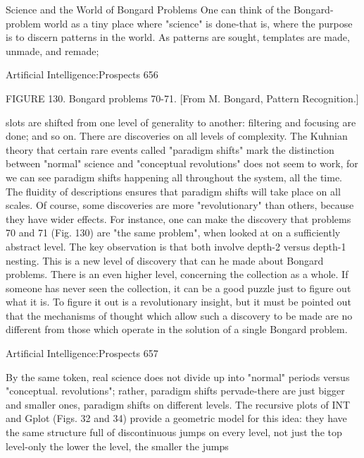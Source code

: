                  Science and the World of Bongard Problems
   One can think of the Bongard-problem world as a tiny place where "science" is
   done-that is, where the purpose is to discern patterns in the world. As patterns are
   sought, templates are made, unmade, and remade;




Artificial Intelligence:Prospects                                                      656

   FIGURE 130. Bongard problems 70-71. [From M. Bongard, Pattern
   Recognition.]

   slots are shifted from one level of generality to another: filtering and focusing are
   done; and so on. There are discoveries on all levels of complexity. The Kuhnian
   theory that certain rare events called "paradigm shifts" mark the distinction
   between "normal" science and "conceptual revolutions" does not seem to work,
   for we can see paradigm shifts happening all throughout the system, all the time.
   The fluidity of descriptions ensures that paradigm shifts will take place on all
   scales.
       Of course, some discoveries are more "revolutionary" than others, because
   they have wider effects. For instance, one can make the discovery that problems
   70 and 71 (Fig. 130) are "the same problem", when looked at on a sufficiently
   abstract level. The key observation is that both involve depth-2 versus depth-1
   nesting. This is a new level of discovery that can he made about Bongard
   problems. There is an even higher level, concerning the collection as a whole. If
   someone has never seen the collection, it can be a good puzzle just to figure out
   what it is. To figure it out is a revolutionary insight, but it must be pointed out that
   the mechanisms of thought which allow such a discovery to be made are no
   different from those which operate in the solution of a single Bongard problem.




Artificial Intelligence:Prospects                                                         657

By the same token, real science does not divide up into "normal" periods versus
"conceptual. revolutions"; rather, paradigm shifts pervade-there are just bigger and
smaller ones, paradigm shifts on different levels. The recursive plots of INT and
Gplot (Figs. 32 and 34) provide a geometric model for this idea: they have the same
structure full of discontinuous jumps on every level, not just the top level-only the
lower the level, the smaller the jumps

